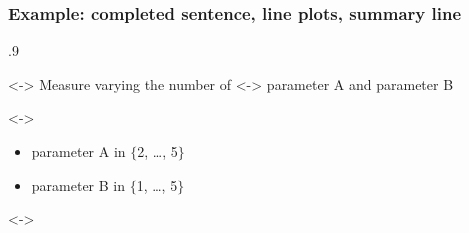 
\begin{frame}
    \frametitle{Example: completed sentence, line plots, summary line}

    \pgfmathsetmacro{}
    \pgfmathsetmacro{}
    \pgfmathsetmacro{}
    \pgfmathsetmacro{}

    \begin{overlayarea}{\textwidth}{.9\textheight}

        \only<\numberPreStart-\numberGraphEnd>{
            \alert{Measure} varying the number of }
        \only<\numberGraphStart-\numberGraphEnd>{%
            \alert{parameter A} and \alert{parameter B}
        }

        \only<\numberPreStart-\numberPreEnd>{

            \vspace{1em}

            \begin{itemize}\setlength{\itemsep}{1em}
                \item \alert{parameter A} in $\{$2, \ldots, 5$\}$
                \item \alert{parameter B} in $\{$1, \ldots, 5$\}$
            \end{itemize}

        }

        \only<\numberGraphStart-\numberGraphEnd>{

            \vspace{1em}

            \dataTableVaryingA
            \dataTableVaryingB

}
\end{overlayarea}
\end{frame}

